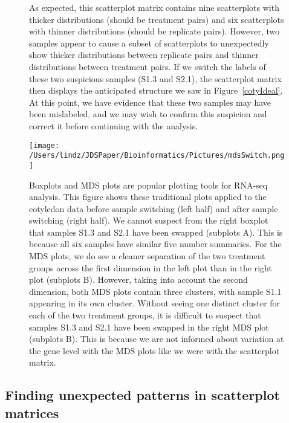 \documentclass[referee]{biom}
\begin{document}
\begin{figure}
\begin{center}
\centerline{}
\end{center}
\caption{As expected, this scatterplot matrix contains nine scatterplots with thicker distributions (should be treatment pairs) and six scatterplots with thinner distributions (should be replicate pairs). However, two samples appear to cause a subset of scatterplots to unexpectedly show thicker distributions between replicate pairs and thinner distributions between treatment pairs. If we switch the labels of these two suspicious samples (S1.3 and S2.1), the scatterplot matrix then displays the anticipated structure we saw in Figure~\ref{cotyIdeal}. At this point, we have evidence that these two samples may have been mislabeled, and we may wish to confirm this suspicion and correct it before continuing with the analysis.
\label{switchedScatMat}}
\end{figure}

\begin{figure}
\begin{center}
\centerline{\texttt{[image: /Users/lindz/JDSPaper/Bioinformatics/Pictures/mdsSwitch.png]}}
\end{center}
\caption{Boxplots and MDS plots are popular plotting tools for RNA-seq analysis. This figure shows these traditional plots applied to the cotyledon data before sample switching (left half) and after sample switching (right half). We cannot suspect from the right boxplot that samples S1.3 and S2.1 have been swapped (subplots A). This is because all six samples have similar five number summaries. For the MDS plots, we do see a cleaner separation of the two treatment groups across the first dimension in the left plot than in the right plot (subplots B). However, taking into account the second dimension, both MDS plots contain three clusters, with sample S1.1 appearing in its own cluster. Without seeing one distinct cluster for each of the two treatment groups, it is difficult to suspect that samples S1.3 and S2.1 have been swapped in the right MDS plot (subplots B). This is because we are not informed about variation at the gene level with the MDS plots like we were with the scatterplot matrix.
\label{mdsSwitch}}
\end{figure}

\subsection{Finding unexpected patterns in scatterplot matrices}
\label{s:Finding unexpected patterns in scatterplot matrices}
\end{document}
